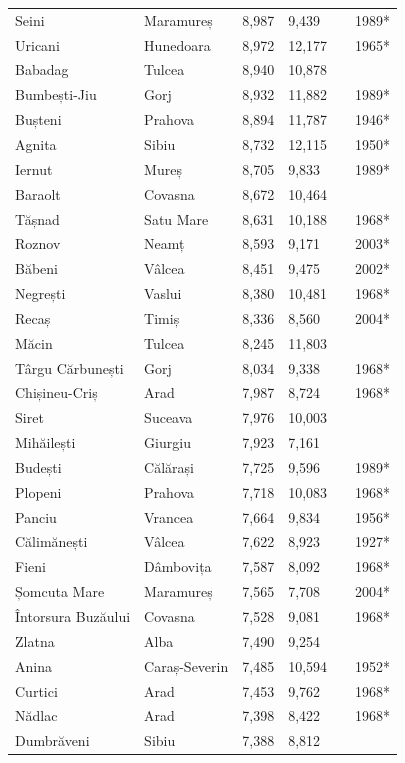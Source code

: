 \documentclass{article}
\begin{document}
\begin{tabular}{llllll}
Seini & Maramureș & 8,987 & 9,439 &  & 1989* \\
Uricani & Hunedoara & 8,972 & 12,177 &  & 1965* \\
Babadag & Tulcea & 8,940 & 10,878 &  &  \\
Bumbești-Jiu & Gorj & 8,932 & 11,882 &  & 1989* \\
Bușteni & Prahova & 8,894 & 11,787 &  & 1946* \\
Agnita & Sibiu & 8,732 & 12,115 &  & 1950* \\
Iernut & Mureș & 8,705 & 9,833 &  & 1989* \\
Baraolt & Covasna & 8,672 & 10,464 &  &  \\
Tășnad & Satu Mare & 8,631 & 10,188 &  & 1968* \\
Roznov & Neamț & 8,593 & 9,171 &  & 2003* \\
Băbeni & Vâlcea & 8,451 & 9,475 &  & 2002* \\
Negrești & Vaslui & 8,380 & 10,481 &  & 1968* \\
Recaș & Timiș & 8,336 & 8,560 &  & 2004* \\
Măcin & Tulcea & 8,245 & 11,803 &  &  \\
Târgu Cărbunești & Gorj & 8,034 & 9,338 &  & 1968* \\
Chișineu-Criș & Arad & 7,987 & 8,724 &  & 1968* \\
Siret & Suceava & 7,976 & 10,003 &  &  \\
Mihăilești & Giurgiu & 7,923 & 7,161 &  &  \\
Budești & Călărași & 7,725 & 9,596 &  & 1989* \\
Plopeni & Prahova & 7,718 & 10,083 &  & 1968* \\
Panciu & Vrancea & 7,664 & 9,834 &  & 1956* \\
Călimănești & Vâlcea & 7,622 & 8,923 &  & 1927* \\
Fieni & Dâmbovița & 7,587 & 8,092 &  & 1968* \\
Șomcuta Mare & Maramureș & 7,565 & 7,708 &  & 2004* \\
Întorsura Buzăului & Covasna & 7,528 & 9,081 &  & 1968* \\
Zlatna & Alba & 7,490 & 9,254 &  &  \\
Anina & Caraș-Severin & 7,485 & 10,594 &  & 1952* \\
Curtici & Arad & 7,453 & 9,762 &  & 1968* \\
Nădlac & Arad & 7,398 & 8,422 &  & 1968* \\
Dumbrăveni & Sibiu & 7,388 & 8,812 &  &  \\

\end{tabular}
\end{document}
